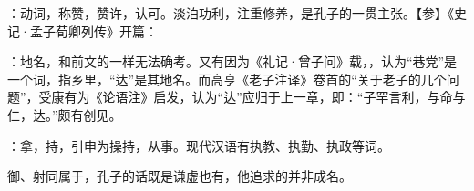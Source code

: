{
\item {}：动词，称赞，赞许，认可。淡泊功利，注重修养，是孔子的一贯主张。【参】《史记·孟子荀卿列传》开篇：
}
{}  %


{
\begin{lyitemize}
\item {}：地名，和前文的一样无法确考。又有因为《礼记·曾子问》载，，认为“巷党”是一个词，指乡里，“达”是其地名。而高亨《老子注译》卷首的“关于老子的几个问题”，受康有为《论语注》启发，认为“达”应归于上一章，即：“子罕言利，与命与仁，达。”颇有创见。%

\item {}：拿，持，引申为操持，从事。现代汉语有执教、执勤、执政等词。
\end{lyitemize}
御、射同属于，孔子的话既是谦虚也有，他追求的并非成名。
}
{}


